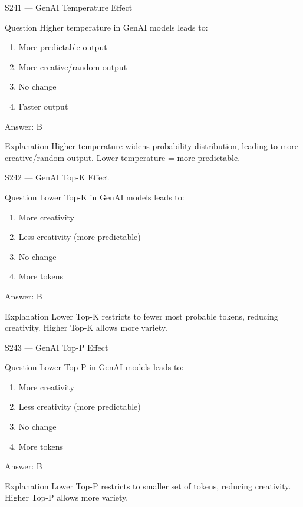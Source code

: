\documentclass[aspectratio=169,8pt]{beamer}
\begin{document}
	\begin{frame}{S241 --- GenAI Temperature Effect}
		\begin{block}{Question}
			Higher temperature in GenAI models leads to:
			\begin{enumerate}
				\item More predictable output
				\item More creative/random output
				\item No change
				\item Faster output
			\end{enumerate}
		\end{block}
		\begin{exampleblock}{Answer: B}\end{exampleblock}
		\begin{block}{Explanation}
			Higher temperature widens probability distribution, leading to more creative/random output. Lower temperature = more predictable.
		\end{block}
	\end{frame}
	
	\begin{frame}{S242 --- GenAI Top-K Effect}
		\begin{block}{Question}
			Lower Top-K in GenAI models leads to:
			\begin{enumerate}
				\item More creativity
				\item Less creativity (more predictable)
				\item No change
				\item More tokens
			\end{enumerate}
		\end{block}
		\begin{exampleblock}{Answer: B}\end{exampleblock}
		\begin{block}{Explanation}
			Lower Top-K restricts to fewer most probable tokens, reducing creativity. Higher Top-K allows more variety.
		\end{block}
	\end{frame}
	
	\begin{frame}{S243 --- GenAI Top-P Effect}
		\begin{block}{Question}
			Lower Top-P in GenAI models leads to:
			\begin{enumerate}
				\item More creativity
				\item Less creativity (more predictable)
				\item No change
				\item More tokens
			\end{enumerate}
		\end{block}
		\begin{exampleblock}{Answer: B}\end{exampleblock}
		\begin{block}{Explanation}
			Lower Top-P restricts to smaller set of tokens, reducing creativity. Higher Top-P allows more variety.
		\end{block}
	\end{frame}
	
\end{document}
